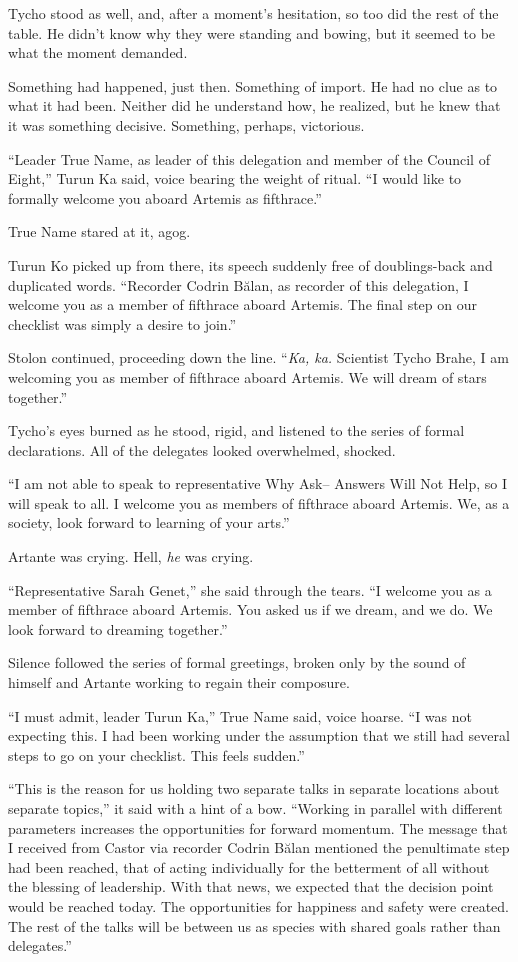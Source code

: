 Tycho stood as well, and, after a moment's hesitation, so too did the rest of the table. He didn't know why they were standing and bowing, but it seemed to be what the moment demanded.

Something had happened, just then. Something of import. He had no clue as to what it had been. Neither did he understand how, he realized, but he knew that it was something decisive. Something, perhaps, victorious.

``Leader True Name, as leader of this delegation and member of the Council of Eight,'' Turun Ka said, voice bearing the weight of ritual. ``I would like to formally welcome you aboard Artemis as fifthrace.''

True Name stared at it, agog.

Turun Ko picked up from there, its speech suddenly free of doublings-back and duplicated words. ``Recorder Codrin Bălan, as recorder of this delegation, I welcome you as a member of fifthrace aboard Artemis. The final step on our checklist was simply a desire to join.''

Stolon continued, proceeding down the line. ``\emph{Ka, ka.} Scientist Tycho Brahe, I am welcoming you as member of fifthrace aboard Artemis. We will dream of stars together.''

Tycho's eyes burned as he stood, rigid, and listened to the series of formal declarations. All of the delegates looked overwhelmed, shocked.

``I am not able to speak to representative Why Ask-- Answers Will Not Help, so I will speak to all. I welcome you as members of fifthrace aboard Artemis. We, as a society, look forward to learning of your arts.''

Artante was crying. Hell, \emph{he} was crying.

``Representative Sarah Genet,'' she said through the tears. ``I welcome you as a member of fifthrace aboard Artemis. You asked us if we dream, and we do. We look forward to dreaming together.''

Silence followed the series of formal greetings, broken only by the sound of himself and Artante working to regain their composure.

``I must admit, leader Turun Ka,'' True Name said, voice hoarse. ``I was not expecting this. I had been working under the assumption that we still had several steps to go on your checklist. This feels sudden.''

``This is the reason for us holding two separate talks in separate locations about separate topics,'' it said with a hint of a bow. ``Working in parallel with different parameters increases the opportunities for forward momentum. The message that I received from Castor via recorder Codrin Bălan mentioned the penultimate step had been reached, that of acting individually for the betterment of all without the blessing of leadership. With that news, we expected that the decision point would be reached today. The opportunities for happiness and safety were created. The rest of the talks will be between us as species with shared goals rather than delegates.''

